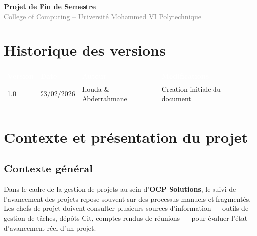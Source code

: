 \documentclass[12pt,a4paper]{article}
\begin{document}
\begin{titlepage}
\vfill

{\large\textcolor{primary}{\textbf{Projet de Fin de Semestre}}}\\[0.3cm]
{\normalsize\textcolor{gray}{College of Computing -- Universit\'e Mohammed VI Polytechnique}}

\vspace{1.5cm}
\end{titlepage}

\renewcommand{\cftsecfont}{\bfseries\color{primary}}
\renewcommand{\cftsecpagefont}{\bfseries\color{primary}}
\renewcommand{\cftsubsecfont}{\color{darktext}}
\renewcommand{\cftsecdotsep}{\cftdotsep}
\tableofcontents
\newpage

\section{Historique des versions}

\begin{center}
\begin{tabularx}{\textwidth}{|C{1.5cm}|C{2.5cm}|C{4cm}|X|}
\hline
{}
\textcolor{white}{\textbf{Version}} & \textcolor{white}{\textbf{Date}} & \textcolor{white}{\textbf{Auteur}} & \textcolor{white}{\textbf{Modifications}} \\
 & 23/02/2026 & Houda \& Abderrahmane & Cr\'eation initiale du document \\
\hline
{}
 &  &  &  \\
\hline
\end{tabularx}
\end{center}

\section{Contexte et pr\'esentation du projet}

\subsection{Contexte g\'en\'eral}
Dans le cadre de la gestion de projets au sein d'\textbf{OCP Solutions}, le suivi de l'avancement des projets repose souvent sur des processus manuels et fragment\'es. Les chefs de projet doivent consulter plusieurs sources d'information --- outils de gestion de t\^aches, d\'ep\^ots Git, comptes rendus de r\'eunions --- pour \'evaluer l'\'etat d'avancement r\'eel d'un projet.
\end{document}
